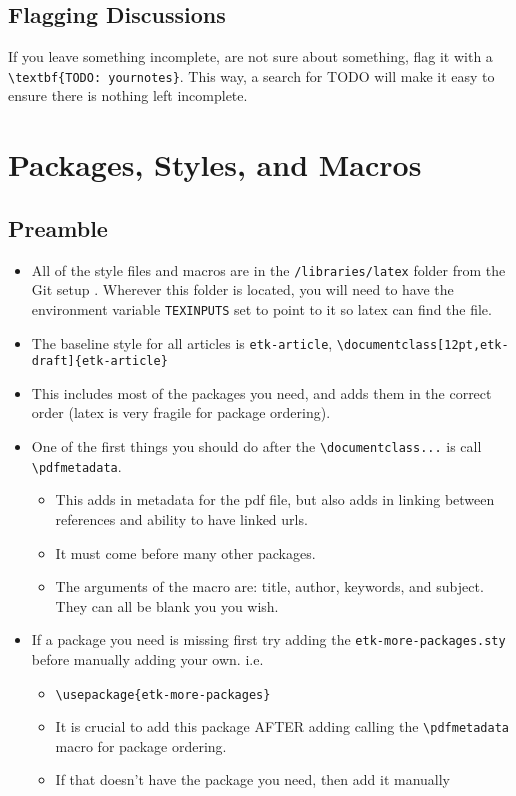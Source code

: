 \documentclass[12pt,etk-draft]{etk-article}
\begin{document}
\subsection{Flagging Discussions}
If you leave something incomplete, are not sure about something, flag it with a \verb!\textbf{TODO: yournotes}!.  This way, a search for TODO will make it easy to ensure there is nothing left incomplete.


\section{Packages, Styles, and Macros}
\subsection{Preamble}
\begin{itemize}
\item All of the style files and macros are in the \verb!/libraries/latex! folder from the Git setup .  Wherever this folder is located, you will need to have the environment variable \verb!TEXINPUTS! set to point to it so latex can find the file.
\item The baseline style for all articles is \verb!etk-article!, \verb!\documentclass[12pt,etk-draft]{etk-article}!
\item This includes most of the packages you need, and adds them in the correct order (latex is very fragile for package ordering).
\item One of the first things you should do after the \verb!\documentclass...! is call \verb!\pdfmetadata!.
\begin{itemize}
\item This adds in metadata for the pdf file, but also adds in linking between references and ability to have linked urls.
\item It must come before many other packages.
\item The arguments of the macro are: title, author, keywords, and subject.  They can all be blank you you wish.
\end{itemize}  
\item If a package you need is missing first try adding the \verb!etk-more-packages.sty! before manually adding your own.  i.e. 
\begin{itemize}
\item \verb!\usepackage{etk-more-packages}!
\item It is crucial to add this package AFTER adding calling the \verb!\pdfmetadata! macro for package ordering.
\item If that doesn't have the package you need, then add it manually
\end{itemize}
\end{itemize}
\end{document}

